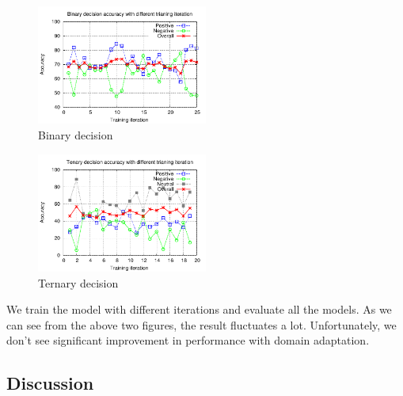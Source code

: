\begin{itemize}
\begin{figure}[H]
\begin{center}
\includegraphics[width = 0.5\textwidth]{pic/model_2b.pdf}
\caption{Binary decision }
\end{center}
\end{figure}

\begin{figure}[H]
\begin{center}
\includegraphics[width = 0.5\textwidth]{pic/model_3c.pdf}
\caption{Ternary decision }
\end{center}
\end{figure}

We train the model with different iterations and evaluate all the models. As we can see from the above two figures, the result fluctuates a lot. Unfortunately, we don't see significant improvement in performance with domain adaptation.  


\subsection{Discussion}


\end{itemize}







